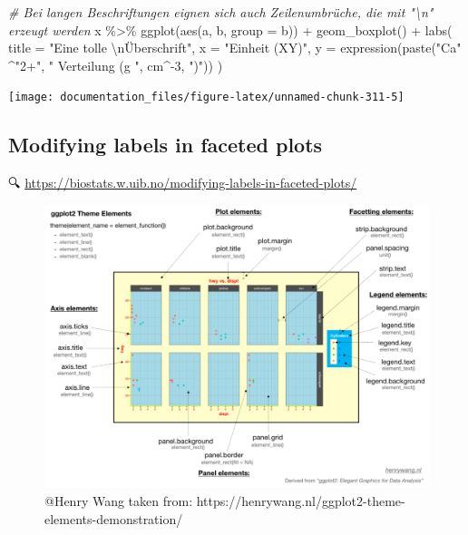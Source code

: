 \documentclass[
]{article}
\newenvironment{Shaded}{\begin{snugshade}}{\end{snugshade}}
\newcommand{\AttributeTok}[1]{\textcolor[rgb]{0.77,0.63,0.00}{#1}}
\newcommand{\CommentTok}[1]{\textcolor[rgb]{0.56,0.35,0.01}{\textit{#1}}}
\newcommand{\DecValTok}[1]{\textcolor[rgb]{0.00,0.00,0.81}{#1}}
\newcommand{\FunctionTok}[1]{\textcolor[rgb]{0.00,0.00,0.00}{#1}}
\newcommand{\NormalTok}[1]{#1}
\newcommand{\SpecialCharTok}[1]{\textcolor[rgb]{0.00,0.00,0.00}{#1}}
\newcommand{\StringTok}[1]{\textcolor[rgb]{0.31,0.60,0.02}{#1}}
\begin{document}
\begin{Shaded}
\begin{Highlighting}[]

\CommentTok{\# Bei langen Beschriftungen eignen sich auch Zeilenumbrüche, die mit "\textbackslash{}n" erzeugt werden}
\NormalTok{x }\SpecialCharTok{\%\textgreater{}\%}
  \FunctionTok{ggplot}\NormalTok{(}\FunctionTok{aes}\NormalTok{(a, b, }\AttributeTok{group =}\NormalTok{ b)) }\SpecialCharTok{+}
  \FunctionTok{geom\_boxplot}\NormalTok{() }\SpecialCharTok{+}
  \FunctionTok{labs}\NormalTok{(}
    \AttributeTok{title =} \StringTok{"Eine tolle }\SpecialCharTok{\textbackslash{}n}\StringTok{Überschrift"}\NormalTok{,}
    \AttributeTok{x =} \StringTok{"Einheit (XY)"}\NormalTok{,}
    \AttributeTok{y =} \FunctionTok{expression}\NormalTok{(}\FunctionTok{paste}\NormalTok{(}\StringTok{"Ca"} \SpecialCharTok{\^{}}\StringTok{"2+"}\NormalTok{, }\StringTok{" Verteilung (g "}\NormalTok{, cm}\SpecialCharTok{\^{}{-}}\DecValTok{3}\NormalTok{, }\StringTok{")"}\NormalTok{))}
\NormalTok{  )}
\end{Highlighting}
\end{Shaded}

\begin{center}\texttt{[image: documentation\_files/figure-latex/unnamed-chunk-311-5]} \end{center}

\hypertarget{modifying-labels-in-faceted-plots}{%
\subsection{Modifying labels in faceted plots}\label{modifying-labels-in-faceted-plots}}

🔍 \url{https://biostats.w.uib.no/modifying-labels-in-faceted-plots/}

\begin{figure}

{\centering \includegraphics[width=14.22in]{images/048} 

}

\caption{@Henry Wang taken from: https://henrywang.nl/ggplot2-theme-elements-demonstration/}\label{fig:unnamed-chunk-312}
\end{figure}
\end{document}
